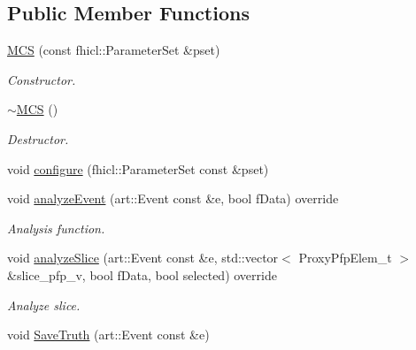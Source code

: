 \subsection*{Public Member Functions}
\begin{DoxyCompactItemize}
\item 
\hyperlink{classanalysis_1_1MCS_a5b7cf9263cda1533b6d519fa7a062669}{M\+CS} (const fhicl\+::\+Parameter\+Set \&pset)
\begin{DoxyCompactList}\small\item\em Constructor. \end{DoxyCompactList}\item 
\hyperlink{classanalysis_1_1MCS_a1dc65e0c13ff735d3d71d5810b0421cd}{$\sim$\+M\+CS} ()\hypertarget{classanalysis_1_1MCS_a1dc65e0c13ff735d3d71d5810b0421cd}{}\label{classanalysis_1_1MCS_a1dc65e0c13ff735d3d71d5810b0421cd}

\begin{DoxyCompactList}\small\item\em Destructor. \end{DoxyCompactList}\item 
void \hyperlink{classanalysis_1_1MCS_a08b71478f6b3e5de8ec5e6cd7270ca88}{configure} (fhicl\+::\+Parameter\+Set const \&pset)
\item 
void \hyperlink{classanalysis_1_1MCS_a109c25af415ea4b3806e21211b2c6861}{analyze\+Event} (art\+::\+Event const \&e, bool f\+Data) override
\begin{DoxyCompactList}\small\item\em Analysis function. \end{DoxyCompactList}\item 
void \hyperlink{classanalysis_1_1MCS_ad965dd7aebabe0651bc63f5c8e90cc82}{analyze\+Slice} (art\+::\+Event const \&e, std\+::vector$<$ Proxy\+Pfp\+Elem\+\_\+t $>$ \&slice\+\_\+pfp\+\_\+v, bool f\+Data, bool selected) override\hypertarget{classanalysis_1_1MCS_ad965dd7aebabe0651bc63f5c8e90cc82}{}\label{classanalysis_1_1MCS_ad965dd7aebabe0651bc63f5c8e90cc82}

\begin{DoxyCompactList}\small\item\em Analyze slice. \end{DoxyCompactList}\item 
void \hyperlink{classanalysis_1_1MCS_a0c7559cefba9afb54fd53aa2b049d975}{Save\+Truth} (art\+::\+Event const \&e)\hypertarget{classanalysis_1_1MCS_a0c7559cefba9afb54fd53aa2b049d975}{}\label{classanalysis_1_1MCS_a0c7559cefba9afb54fd53aa2b049d975}


\end{DoxyCompactItemize}
